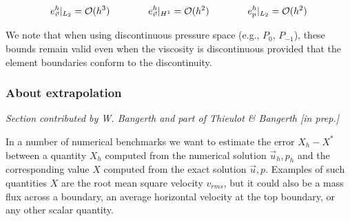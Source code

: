 \begin{equation}
e_{\vec v}^h|_{L_2} = {\cal O}(h^3)
\quad\quad\quad\quad
e_{\vec v}^h|_{H^1} = {\cal O}(h^2)
\quad\quad\quad\quad
e_{p}^h|_{L_2} = {\cal O}(h^2)
\end{equation}

We note that when using discontinuous pressure space
(e.g., $P_0$, $P_{-1}$), these bounds remain valid even
when the viscosity is discontinuous provided that the element boundaries conform to the discontinuity.

 
\subsubsection{About extrapolation}

{\it Section contributed by W. Bangerth and part of Thieulot \& Bangerth [in prep.]}

In a number of numerical benchmarks we
want to estimate the error $X_h-X^\ast$ between a quantity $X_h$ computed
from the numerical solution $\vec{u}_h,p_h$ and the corresponding value
$X$ computed from the exact solution $\vec{u},p$. Examples of such quantities
$X$ are the root mean square velocity $v_{rms}$, but it could also be a mass flux
across a boundary, an average horizontal velocity at the top boundary, or
any other scalar quantity.


